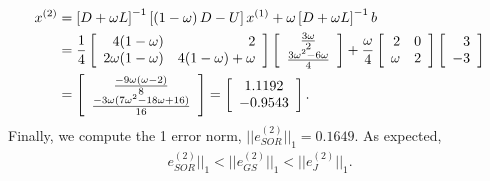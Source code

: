 \begin{questions}
\begin{solution}
\begin{itemize}
\begin{align*}
x^{(2)}&=\left[D+\omega L\right]^{-1}\left[\left(1-\omega\right)D-U\right]x^{(1)}+\omega \left[D+\omega L\right]^{-1}b\\
&=\frac{1}{4}\left[
	\begin{array}{r r} 
	4(1-\omega) & 2 \\
	2\omega(1-\omega) & 4(1-\omega)+\omega \\
	\end{array} \right]\left[
	\begin{array}{c c} 
	\frac{3\omega}{2} \\
	\frac{3\omega^2-6\omega}{4} \\
	\end{array} \right]+\frac{\omega}{4}\left[
	\begin{array}{r r} 
	2 & 0 \\
	\omega & 2 \\
	\end{array} \right]\left[
	\begin{array}{r r} 
	3 \\
	-3 \\
	\end{array} \right]\\
	&=\left[
	\begin{array}{c c} 
	\frac{-9\omega(\omega-2)}{8} \\
	\frac{-3\omega(7\omega^2-18\omega+16)}{16}\\
	\end{array} \right]=\left[
	\begin{array}{c c} 
	1.1192 \\
	-0.9543\\
	\end{array} \right].
\end{align*}
Finally, we compute the 1 error norm, $||e_{SOR}^{(2)}||_1=0.1649$. As expected,
\begin{align*}
e_{SOR}^{(2)}||_1<||e_{GS}^{(2)}||_1<||e_{J}^{(2)}||_1.
\end{align*}
\end{itemize}
\end{solution}
\end{questions}

